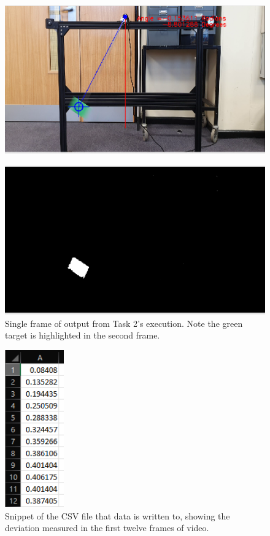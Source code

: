 \documentclass[conference]{IEEEtran}
\begin{document}
\begin{figure}[H]
\centering
\includegraphics[width=5in]{t2_output2}
\end{figure}
\begin{figure}[H]
\centering
\includegraphics[width=5in]{t2_output3}
\caption{Single frame of output from Task 2's execution. Note the green target is highlighted in the second frame.}
\label{fig_t2output}
\end{figure}
\begin{figure}[H]
\centering
\includegraphics[width=1in]{csv}
\caption{Snippet of the CSV file that data is written to, showing the deviation measured in the first twelve frames of video.}
\label{fig:csv}
\end{figure}
\end{document}
